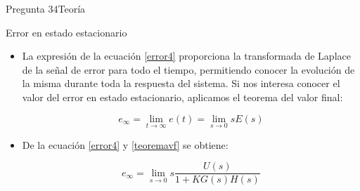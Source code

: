 \documentclass[10pt]{beamer}
\begin{document}

\begin{frame}{Pregunta 34}{Teoría}
\begin{block}{Error en estado estacionario}
  \begin{itemize}
    \item<1-> La expresión de la ecuación \ref{error4} proporciona la transformada de Laplace de la señal de error para todo el tiempo, permitiendo conocer la evolución de la misma durante toda la respuesta del sistema. Si nos interesa conocer el valor del error en estado estacionario, aplicamos el teorema del valor final:
    
    \begin{equation}\label{teoremavf}
        e_{\infty} = \lim\limits_{t \to \infty} e(t) = \lim\limits_{s \to 0} sE(s)
    \end{equation}
    
    \vspace{}
    
    \item<2-> De la ecuación \ref{error4} y \ref{teoremavf} se obtiene:
    
    \begin{equation}\label{sserror}
        \boxed{e_{\infty} = \lim\limits_{s \to 0} s \frac{U(s)}{1+KG(s)H(s)}}
    \end{equation}
    
  \end{itemize}
 

\end{block}
\end{frame}



\end{document}
